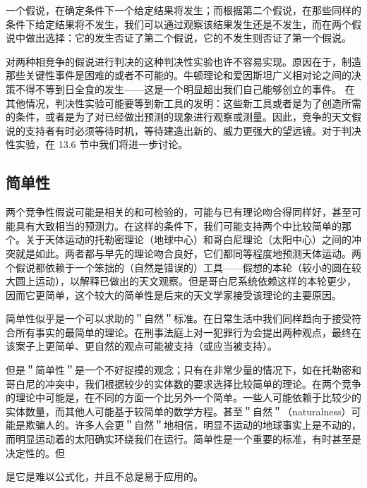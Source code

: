 一个假说，在确定条件下一个给定结果将发生；而根据第二个假说，在那些同样的条件下给定结果将不发生，我们可以通过观察该结果发生还是不发生，而在两个假说中做出选择：它的发生否证了第二个假说，它的不发生则否证了第一个假说。

对两种相竞争的假说进行判决的这种判决性实验也许不容易实现。原因在于，制造那些关键性事件是困难的或者不可能的。牛顿理论和爱因斯坦广义相对论之间的决策不得不等到日全食的发生——这是一个明显超出我们自己能够创立的事件。\cite{eddington1919} 在其他情况，判决性实验可能要等到新工具的发明：这些新工具或者是为了创造所需的条件，或者是为了对已经做出预测的现象进行观察或测量。因此，竞争的天文假说的支持者有时必须等待时机，等待建造出新的、威力更强大的望远镜。对于判决性实验，在 13.6 节中我们将进一步讨论。

\subsection{简单性}
两个竞争性假说可能是相关的和可检验的，可能与已有理论吻合得同样好，甚至可能具有大致相当的预测力。在这样的条件下，我们可能支持两个中比较简单的那个。关于天体运动的托勒密理论（地球中心）和哥白尼理论（太阳中心）之间的冲突就是如此。两者都与早先的理论吻合良好，它们都同等程度地预测天体运动。两个假说都依赖于一个笨拙的（自然是错误的）工具——假想的本轮（较小的圆在较大圆上运动），以解释已做出的天文观察。但是哥白尼系统依赖这样的本轮更少，因而它更简单，这个较大的简单性是后来的天文学家接受该理论的主要原因。\cite{kuhn1957b}

简单性似乎是一个可以求助的＂自然＂标准。在日常生活中我们同样趋向于接受符合所有事实的最简单的理论。在刑事法庭上对一犯罪行为会提出两种观点，最终在该案子上更简单、更自然的观点可能被支持（或应当被支持）。

但是＂简单性＂是一个不好捉摸的观念；只有在非常少量的情况下，如在托勒密和哥白尼的冲突中，我们根据较少的实体数的要求选择比较简单的理论。在两个竞争的理论中可能是，在不同的方面一个比另外一个简单。一些人可能依赖于比较少的实体数量，而其他人可能基于较简单的数学方程。甚至＂自然＂（naturalness）可能是欺骗人的。许多人会更＂自然＂地相信，明显不运动的地球事实上是不动的，而明显运动着的太阳确实环绕我们在运行。简单性是一个重要的标准，有时甚至是决定性的。但

是它是难以公式化，并且不总是易于应用的。

